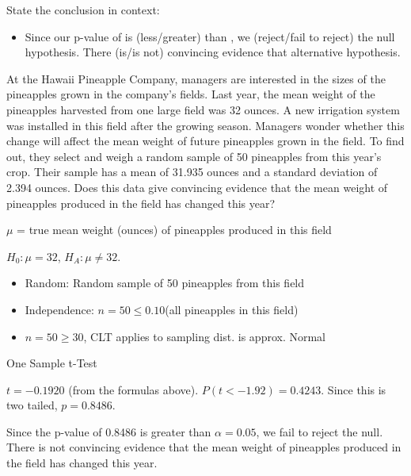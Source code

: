 \documentclass[../stats.tex]{subfiles}
\begin{document}
State the conclusion in context: 
\begin{itemize}
    \item Since our p-value of \blank is (less/greater) than \blank, we (reject/fail to reject) the null hypothesis. There (is/is not) convincing evidence that {alternative hypothesis}.
\end{itemize}

\begin{example}
    At the Hawaii Pineapple Company, managers are interested in the sizes of the pineapples grown in the company's fields. Last year, the mean weight of the pineapples harvested from one large field was 32 ounces.
    A new irrigation system was installed in this field after the growing season. Managers wonder whether this change will affect the mean weight of future pineapples grown in the field. To find out, they select and weigh a random sample of 50 pineapples from this year's crop.
    Their sample has a mean of 31.935 ounces and a standard deviation of 2.394 ounces. Does this data give convincing evidence that the mean weight of pineapples produced in the field has changed this year?

    $\mu$ = true mean weight (ounces) of pineapples produced in this field 

    $H_0: \mu=32$, $H_A: \mu\neq 32$.

    \begin{itemize}
        \item Random: Random sample of 50 pineapples from this field 
        \item Independence: $n=50\leq 0.10$(all pineapples in this field)
        \item $n=50\geq 30$, CLT applies to sampling dist. is approx. Normal 
    \end{itemize}

    One Sample t-Test 

    $t=-0.1920$ (from the formulas above). $P(t<-1.92)=0.4243$. Since this is two tailed, $p=0.8486$.

    Since the p-value of 0.8486 is greater than $\alpha=0.05$, we fail to reject the null. There is not convincing evidence that the mean weight of pineapples produced in the field has changed this year.
\end{example}
\end{document}
